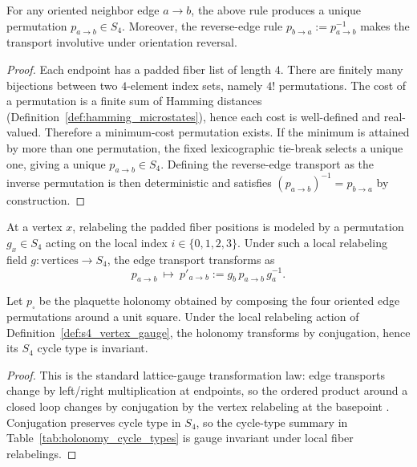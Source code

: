 \begin{lemma}\label{lem:edge_transport_welldefined}
For any oriented neighbor edge $a\to b$, the above rule produces a unique permutation $p_{a\to b}\in S_4$.
Moreover, the reverse-edge rule $p_{b\to a}:=p_{a\to b}^{-1}$ makes the transport involutive under orientation reversal.
\end{lemma}
\begin{proof}
Each endpoint has a padded fiber list of length $4$.
There are finitely many bijections between two $4$-element index sets, namely $4!$ permutations.
The cost of a permutation is a finite sum of Hamming distances (Definition~\ref{def:hamming_microstates}), hence each cost is well-defined and real-valued.
Therefore a minimum-cost permutation exists.
If the minimum is attained by more than one permutation, the fixed lexicographic tie-break selects a unique one, giving a unique $p_{a\to b}\in S_4$.
Defining the reverse-edge transport as the inverse permutation is then deterministic and satisfies $(p_{a\to b})^{-1}=p_{b\to a}$ by construction.
\end{proof}

\begin{definition}\label{def:s4_vertex_gauge}
At a vertex $x$, relabeling the padded fiber positions is modeled by a permutation $g_x\in S_4$ acting on the local index $i\in\{0,1,2,3\}$.
Under such a local relabeling field $g:\text{vertices}\to S_4$, the edge transport transforms as
\[
p_{a\to b}\ \mapsto\ p'_{a\to b}:=g_b\,p_{a\to b}\,g_a^{-1}.
\]
\end{definition}

\begin{proposition}\label{prop:cycle_type_gauge_invariant}
Let $p_\square$ be the plaquette holonomy obtained by composing the four oriented edge permutations around a unit square.
Under the local relabeling action of Definition~\ref{def:s4_vertex_gauge}, the holonomy transforms by conjugation, hence its $S_4$ cycle type is invariant.
\end{proposition}
\begin{proof}
This is the standard lattice-gauge transformation law: edge transports change by left/right multiplication at endpoints, so the ordered product around a closed loop changes by conjugation by the vertex relabeling at the basepoint \cite{Wilson1974,Rothe2012}.
Conjugation preserves cycle type in $S_4$, so the cycle-type summary in Table~\ref{tab:holonomy_cycle_types} is gauge invariant under local fiber relabelings.
\end{proof}


